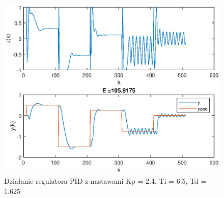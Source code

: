 		\begin{figure}[h!]
			\centering
			\includegraphics[width=\linewidth]{img/strojeniePID_Ziegler_Nichols.eps}
			\caption{Działanie regulatora PID z nastawami Kp = 2.4, Ti = 6.5, Td = 1.625}
			\label{fig:PID1}
		\end{figure}
		
		
